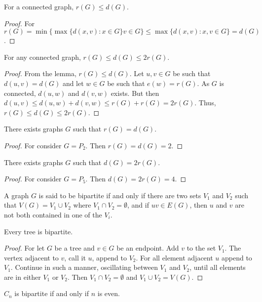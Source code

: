 \documentclass[crop=false,class=book]{standalone}
\begin{document}
\begin{lemma}
For a connected graph, $r(G) \leq d(G)$.
\end{lemma}
\begin{proof}
For $r(G) = \min\{\max\{d(x,v):x\in G\} v\in G\} \leq \max\{d(x,v):x,v\in G\}=d(G)$.
\end{proof}
\begin{theorem}
For any connected graph, $r(G) \leq d(G) \leq 2r(G)$.
\end{theorem}
\begin{proof}
From the lemma, $r(G) \leq d(G)$. Let $u,v\in G$ be such that $d(u,v)=d(G)$ and let $w\in G$ be such that $e(w) = r(G)$. As $G$ is connected, $d(u,w)$ and $d(v,w)$ exists. But then $d(u,v)\leq d(u,w)+d(v,w) \leq r(G)+r(G)=2r(G)$. Thus, $r(G)\leq d(G)\leq 2r(G)$.
\end{proof}
\begin{corollary}
There exists graphs $G$ such that $r(G) = d(G)$.
\end{corollary}
\begin{proof}
For consider $G=P_2$. Then $r(G) = d(G) = 2$.
\end{proof}
\begin{corollary}
There exists graphs $G$ such that $d(G) = 2r(G)$.
\end{corollary}
\begin{proof}
For consider $G=P_5$. Then $d(G) = 2r(G) = 4$.
\end{proof}
\begin{definition}
A graph $G$ is said to be bipartite if and only if there are two sets $V_1$ and $V_2$ such that $V(G) = V_1\cup V_2$ where $V_1\cap V_2 = \emptyset$, and if $uv \in E(G)$, then $u$ and $v$ are not both contained in one of the $V_i$.
\end{definition}
\begin{theorem}
Every tree is bipartite.
\end{theorem}
\begin{proof}
For let $G$ be a tree and $v\in G$ be an endpoint. Add $v$ to the set $V_1$. The vertex adjacent to $v$, call it $u$, append to $V_2$. For all element adjacent $u$ append to $V_1$. Continue in such a manner, oscillating between $V_1$ and $V_2$, until all elements are in either $V_1$ or $V_2$. Then $V_1 \cap V_2 = \emptyset$ and $V_1 \cup V_2 = V(G)$.
\end{proof}
\begin{theorem}
$C_n$ is bipartite if and only if $n$ is even. 
\end{theorem}
\end{document}
